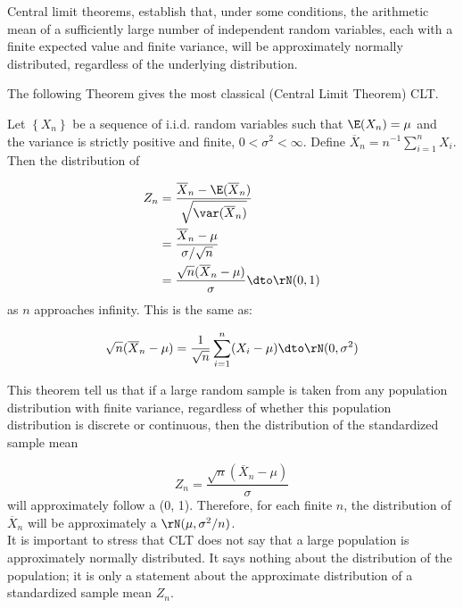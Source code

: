 Central limit theorems, establish that, under some conditions, the arithmetic mean of a sufficiently large number of independent random variables, each with a finite expected value and finite variance, will be approximately normally distributed, regardless of the underlying distribution. 

The following Theorem gives the most classical (Central Limit Theorem) CLT. 


\begin{theorem}\label{theorem:LL_CLT_U}
Let $\left\lbrace X_n \right\rbrace$ be a sequence of i.i.d. random variables such that $\E(X_n) = \mu$ and the variance is strictly positive and finite, $0 < \sigma^2 < \infty$. Define $\overline{X}_n = n^{-1}\sum_{i = 1}^nX_i$. Then the distribution of

\begin{equation*}
  \begin{aligned}
      Z_n & = \frac{\overline{X}_n  - \E(\overline{X}_n)}{\sqrt{\var(\overline{X}_n)}} \\
          & = \frac{\overline{X}_n - \mu}{\sigma / \sqrt{n}} \\
      & = \frac{\sqrt{n}(\overline{X}_n - \mu)}{\sigma} \dto \rN(0, 1)
  \end{aligned}
\end{equation*}
%
as $n$ approaches infinity. This is the same as:
 
 
 \begin{equation*}
  \sqrt{n}(\overline{X}_n - \mu) = \frac{1}{\sqrt{n}}\sum_{i = 1}^n(X_i - \mu)\dto \rN(0, \sigma^2)
 \end{equation*}
\end{theorem}

This theorem tell us that if a large random sample is taken from any population distribution with finite variance, regardless of whether this population distribution is discrete or continuous, then the distribution of the standardized sample mean

\begin{equation*}
Z_n = \frac{\sqrt{n}(\overline{X}_n - \mu)}{\sigma}
\end{equation*}
%
will approximately follow a \rN(0, 1). Therefore, for each finite $n$, the distribution of $\overline{X}_n$ will be approximately a $\rN(\mu, \sigma^2/n)$.\\

It is important to stress that CLT does not say that a large population is approximately normally distributed. It says nothing about the distribution of the population; it is only a statement about the approximate distribution of a standardized sample mean $Z_n$. 


